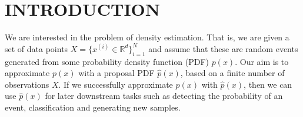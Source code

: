 \documentclass[a4paper,onesided,12pt]{report}
\begin{document}
\tableofcontents
\listoffigures
\listoftables
\begin{symbols}
%

\sym{}{}

\end{symbols}

\begin{abbreviations}
\end{abbreviations}


\chapter{INTRODUCTION}
\label{chapter:intro}

We are interested in the problem of density estimation. That is, we are given a set of data points $X = \{x^{(i)} \in \mathbb{R}^d\}_{i=1}^N$ and assume that these are random events generated from some probability density function (PDF) $p(x)$. Our aim is to approximate $p(x)$ with a proposal PDF $\hat{p}(x)$, based on a finite number of observations $X$. If we successfully approximate $p(x)$ with $\hat{p}(x)$, then we can use $\hat{p}(x)$ for later downstream tasks such as detecting the probability of an event, classification and generating new samples.
\end{document}
